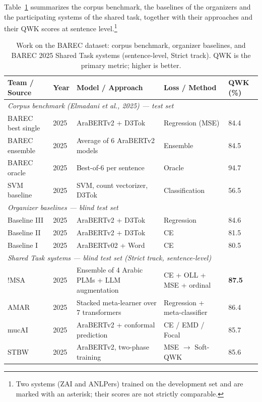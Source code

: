 \documentclass[12pt]{report}
\begin{document}
Table~\ref{tab:barec_systems} ssummarizes the corpus benchmark, the baselines of the organizers and the participating systems of the shared task, together with their approaches and their QWK scores at sentence level.\footnote{Two systems (ZAI and ANLPers) trained on the development set and are marked with an asterisk; their scores are not strictly comparable.}

\begin{table}[H]
\centering
\footnotesize
\caption{Work on the BAREC dataset: corpus benchmark, organizer baselines, and BAREC 2025 Shared Task systems (sentence-level, Strict track). QWK is the primary metric; higher is better.}
\label{tab:barec_systems}
\begin{tabular}{p{2.4cm} p{0.8cm} p{4.8cm} p{2.2cm} p{1.2cm}}
\toprule
\textbf{Team / Source} & \textbf{Year} & \textbf{Model / Approach} & \textbf{Loss / Method} & \textbf{QWK (\%)} \\
\midrule
\multicolumn{5}{l}{\textit{Corpus benchmark (Elmadani et al., 2025) --- test set}} \\
\midrule
BAREC best single & 2025 & AraBERTv2 + D3Tok & Regression (MSE) & 84.4 \\
BAREC ensemble & 2025 & Average of 6 AraBERTv2 models & Ensemble & 84.5 \\
BAREC oracle & 2025 & Best-of-6 per sentence & Oracle & 94.7 \\
SVM baseline & 2025 & SVM, count vectorizer, D3Tok & Classification & 56.5 \\
\midrule
\multicolumn{5}{l}{\textit{Organizer baselines --- blind test set}} \\
\midrule
Baseline III & 2025 & AraBERTv2 + D3Tok & Regression & 84.6 \\
Baseline II & 2025 & AraBERTv2 + D3Tok & CE & 81.5 \\
Baseline I & 2025 & AraBERTv02 + Word & CE & 80.5 \\
\midrule
\multicolumn{5}{l}{\textit{Shared Task systems --- blind test set (Strict track, sentence-level)}} \\
\midrule
!MSA & 2025 & Ensemble of 4 Arabic PLMs + LLM augmentation & CE + OLL + MSE + ordinal & \textbf{87.5} \\
AMAR & 2025 & Stacked meta-learner over 7 transformers & Regression + meta-classifier & 86.4 \\
mucAI & 2025 & AraBERTv2 + conformal prediction & CE / EMD / Focal & 85.7 \\
STBW & 2025 & AraBERTv2, two-phase training & MSE $\rightarrow$ Soft-QWK & 85.6 \\

\end{tabular}
\end{table}
\end{document}
